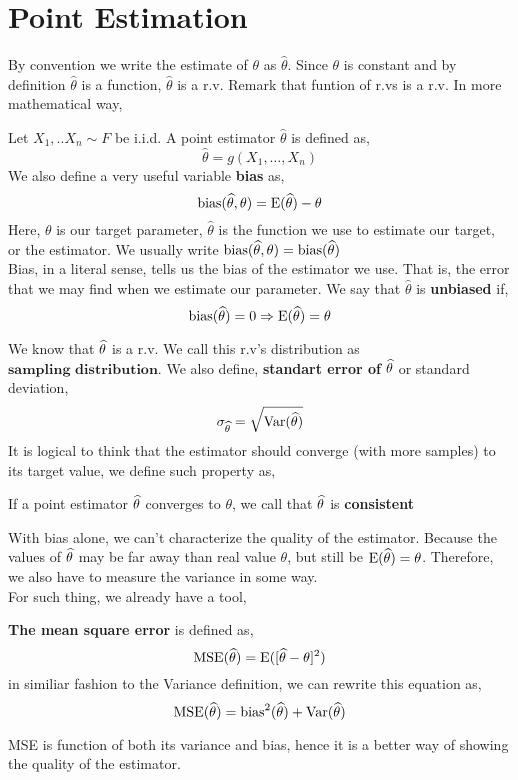 \section{Point Estimation}
By convention we write the estimate of $\theta$ as $\widehat{\theta}$. Since $\theta$ is constant and by definition $\widehat{\theta}$ is a function, $\widehat{\theta}$ is a r.v. Remark that funtion of r.vs is a r.v. In more mathematical way,
\begin{definition}
    Let $X_1,..X_n \sim F$ be i.i.d. A point estimator $\widehat{\theta}$ is defined as,
    \[\widehat{\theta} = g(X_1, \ldots,X_n)\]
    We also define a very useful variable \textbf{bias} as,
    \[\operatorname{bias}(\widehat{\theta}, \theta) = \operatorname{E}(\widehat{\theta}) - \theta\]
    Here, $\theta$ is our target parameter, $\widehat{\theta}$ is the function we use to estimate our target, or the estimator. We usually write $\operatorname{bias}(\widehat{\theta},\theta) = \operatorname{bias}(\widehat{\theta})$ 
    \\
    Bias, in a literal sense, tells us the bias of the estimator we use. That is, the error that we may find when we estimate our parameter. We say that $\widehat{\theta}$ is \textbf{unbiased} if,
    \[\operatorname{bias} (\widehat{\theta}) = 0 \Rightarrow {\operatorname{E}}(\widehat{\theta}) = \theta \]
\end{definition}
We know that ${\widehat{\theta}}$ is a r.v. We call this r.v's distribution as $\textbf{sampling distribution}$. We also define,
\textbf{standart error of} ${\widehat{\theta}}$ or standard deviation,
\[\sigma_{{\widehat{\theta}}}= \sqrt{{\operatorname{Var}}({\widehat{\theta}})}\]
It is logical to think that the estimator should converge (with more samples) to its target value, we define such property as,
\begin{definition}
    If a point estimator ${\widehat{\theta}}$ converges to $\theta$, we call that ${\widehat{\theta}}$ is \textbf{consistent}
\end{definition}

\par
With bias alone, we can't characterize the quality of the estimator. Because the values of ${\widehat{\theta}}$ may be far away than real value $\theta$, but still be ${\operatorname{E}}({\widehat{\theta}}) = \theta$. 
Therefore, we also have to measure the variance in some way.
\\
For such thing, we already have a tool,
\begin{definition} 
    \textbf{The mean square error} is defined as,
    \[\operatorname{MSE}({\widehat{\theta}}) = {\operatorname{E}}([{\widehat{\theta}} - \theta]^2) \]
    in similiar fashion to the Variance definition, we can rewrite this equation as,
    \[\operatorname{MSE}({\widehat{\theta}}) =\operatorname{bias}^2({\widehat{\theta}}) + {\operatorname{Var}}({\widehat{\theta}})\]
\end{definition}
MSE is function of both its variance and bias, hence it is a better way of showing the quality of the estimator.

